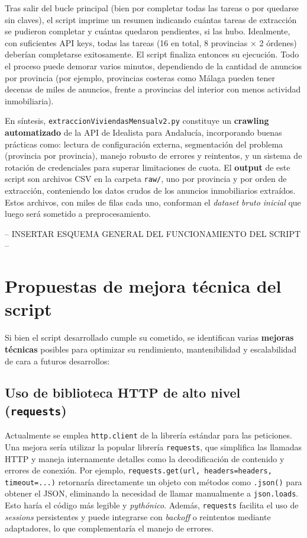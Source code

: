 \documentclass[a4paper,11pt]{book}
\begin{document}
Tras salir del bucle principal (bien por completar todas las tareas o por quedarse sin claves), el script imprime un resumen indicando cuántas tareas de extracción se pudieron completar y cuántas quedaron pendientes, si las hubo. Idealmente, con suficientes API keys, todas las tareas (16 en total, 8 provincias × 2 órdenes) deberían completarse exitosamente. El script finaliza entonces su ejecución. Todo el proceso puede demorar varios minutos, dependiendo de la cantidad de anuncios por provincia (por ejemplo, provincias costeras como Málaga pueden tener decenas de miles de anuncios, frente a provincias del interior con menos actividad inmobiliaria).

En síntesis, \texttt{extraccionViviendasMensualv2.py} constituye un \textbf{crawling automatizado} de la API de Idealista para Andalucía, incorporando buenas prácticas como: lectura de configuración externa, segmentación del problema (provincia por provincia), manejo robusto de errores y reintentos, y un sistema de rotación de credenciales para superar limitaciones de cuota. El \textbf{output} de este script son archivos CSV en la carpeta \texttt{raw/}, uno por provincia y por orden de extracción, conteniendo los datos crudos de los anuncios inmobiliarios extraídos. Estos archivos, con miles de filas cada uno, conforman el \textit{dataset bruto inicial} que luego será sometido a preprocesamiento.




--
INSERTAR ESQUEMA GENERAL DEL FUNCIONAMIENTO DEL SCRIPT
-- 









\section*{Propuestas de mejora técnica del script}

Si bien el script desarrollado cumple su cometido, se identifican varias \textbf{mejoras técnicas} posibles para optimizar su rendimiento, mantenibilidad y escalabilidad de cara a futuros desarrollos:

\subsection*{Uso de biblioteca HTTP de alto nivel (\texttt{requests})}
Actualmente se emplea \texttt{http.client} de la librería estándar para las peticiones. Una mejora sería utilizar la popular librería \texttt{requests}, que simplifica las llamadas HTTP y maneja internamente detalles como la decodificación de contenido y errores de conexión. Por ejemplo, \texttt{requests.get(url, headers=headers, timeout=...)} retornaría directamente un objeto con métodos como \texttt{.json()} para obtener el JSON, eliminando la necesidad de llamar manualmente a \texttt{json.loads}. Esto haría el código más legible y \textit{pythónico}. Además, \texttt{requests} facilita el uso de \textit{sessions} persistentes y puede integrarse con \textit{backoff} o reintentos mediante adaptadores, lo que complementaría el manejo de errores.
\end{document}
